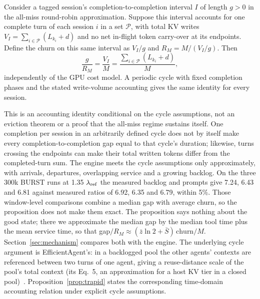 \begin{proposition}\label{prop:trapid}
Consider a tagged session's completion-to-completion interval $I$ of length $g>0$ in the all-miss round-robin approximation. Suppose this interval accounts for one complete turn of each session $i$ in a set $\mathcal P$, with total KV writes $V_I=\sum_{i\in\mathcal P}(L_{k_i}+d)$ and no net in-flight token carry-over at its endpoints. Define the churn on this same interval as $V_I/g$ and $R_M=M/(V_I/g)$. Then
\[
\frac{g}{R_M}=\frac{V_I}{M}
=\frac{\sum_{i\in\mathcal P}(L_{k_i}+d)}{M},
\]
independently of the GPU cost model. A periodic cycle with fixed completion phases and the stated write-volume accounting gives the same identity for every session.
\end{proposition}
\noindent This is an accounting identity conditional on the cycle assumptions, not an eviction theorem or a proof that the all-miss regime sustains itself. One completion per session in an arbitrarily defined cycle does not by itself make every completion-to-completion gap equal to that cycle's duration; likewise, turns crossing the endpoints can make their total written tokens differ from the completed-turn sum. The engine meets the cycle assumptions only approximately, with arrivals, departures, overlapping service and a growing backlog. On the three 300k BURST runs at 1.35 $\lambda_{\mathrm{ref}}$ the measured backlog and prompts give 7.24, 6.43 and 6.81 against measured ratios of 6.92, 6.35 and 6.79, within 5\%. Those window-level comparisons combine a median gap with average churn, so the proposition does not make them exact. The proposition says nothing about the good state; there we approximate the median gap by the median tool time plus the mean service time, so that gap$/R_M\approx(\bar z\ln 2+\bar S)\,\text{churn}/M$. Section~\ref{sec:mechanism} compares both with the engine. The underlying cycle argument is EfficientAgent's: in a backlogged pool the other agents' contexts are referenced between two turns of one agent, giving a reuse-distance scale of the pool's total context (its Eq.~5, an approximation for a host KV tier in a closed pool)~\citep{shao2026efficientagent}. Proposition~\ref{prop:trapid} states the corresponding time-domain accounting relation under explicit cycle assumptions.

